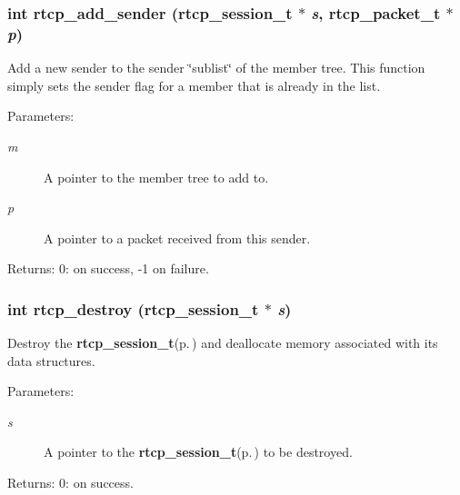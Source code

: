\subsubsection{\setlength{\rightskip}{0pt plus 5cm}int rtcp\_\-add\_\-sender ({\bf rtcp\_\-session\_\-t} $\ast$ {\em s}, {\bf rtcp\_\-packet\_\-t} $\ast$ {\em p})\hspace{0.3cm}{\tt  [static]}}\label{rtcp_8h_a8}


Add a new sender to the sender \char`\"{}sublist\char`\"{} of the member tree. This function simply sets the sender flag for a member that is already in the list. \begin{Desc}
\item[Parameters:]
\begin{description}
\item[{\em m}]A pointer to the member tree to add to. \item[{\em p}]A pointer to a packet received from this sender. \end{description}
\end{Desc}
\begin{Desc}
\item[Returns:]0: on success, -1 on failure. \end{Desc}
\subsubsection{\setlength{\rightskip}{0pt plus 5cm}int rtcp\_\-destroy ({\bf rtcp\_\-session\_\-t} $\ast$ {\em s})}\label{rtcp_8h_a1}


Destroy the {\bf rtcp\_\-session\_\-t}{\rm (p.\,\pageref{structrtcp__session__t})} and deallocate memory associated with its data structures. \begin{Desc}
\item[Parameters:]
\begin{description}
\item[{\em s}]A pointer to the {\bf rtcp\_\-session\_\-t}{\rm (p.\,\pageref{structrtcp__session__t})} to be destroyed. \end{description}
\end{Desc}
\begin{Desc}
\item[Returns:]0: on success. \end{Desc}

